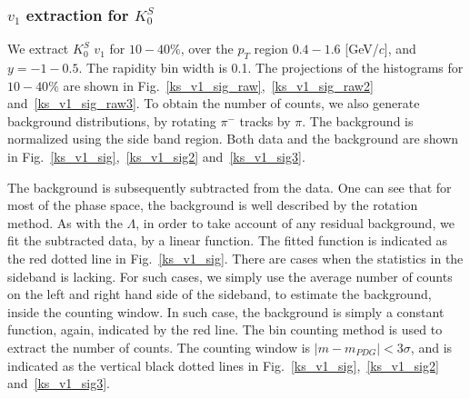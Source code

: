 \subsubsection{$v_1$ extraction for $K^{S}_0$}

We extract $K^{S}_0$ $v_1$ for $10-40\%$, over the $p_{T}$ region $0.4-1.6$ [GeV/$c$], and $y=-1 - 0.5$. The rapidity bin width is 0.1.  
The projections of the histograms for $10-40\%$ are shown in Fig.~\ref{ks_v1_sig_raw},~\ref{ks_v1_sig_raw2} and~\ref{ks_v1_sig_raw3}. To obtain the number of counts, we also generate background distributions, by rotating $\pi^{-}$ tracks by $\pi$. The background is normalized using the side band region. Both data and the background are shown in Fig.~\ref{ks_v1_sig},~\ref{ks_v1_sig2} and~\ref{ks_v1_sig3}.

The background is subsequently subtracted from the data. One can see that for most of the phase space, the background is well described by the rotation method. As with the $\Lambda$, in order to take account of any residual background, we fit the subtracted data, by a linear function. The fitted function is indicated as the red dotted line in Fig.~\ref{ks_v1_sig}. There are cases when the statistics in the sideband is lacking. For such cases, we simply use the average number of counts on the left and right hand side of the sideband, to estimate the background, inside the counting window. In such case, the background is simply a constant function, again, indicated by the red line. The bin counting method is used to extract the number of counts. The counting window is $|m-m_{PDG}|<3\sigma$, and is indicated as the vertical black dotted lines in Fig.~\ref{ks_v1_sig},~\ref{ks_v1_sig2} and~\ref{ks_v1_sig3}.

